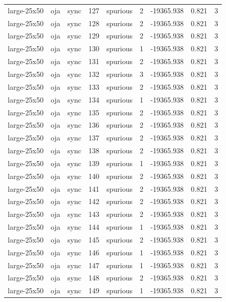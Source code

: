 \begin{tabular}{lllrlrrrr}
large-25x50 & oja & sync & 127 & spurious & 2 & -19365.938 & 0.821 & 3 \\
large-25x50 & oja & sync & 128 & spurious & 2 & -19365.938 & 0.821 & 3 \\
large-25x50 & oja & sync & 129 & spurious & 2 & -19365.938 & 0.821 & 3 \\
large-25x50 & oja & sync & 130 & spurious & 1 & -19365.938 & 0.821 & 3 \\
large-25x50 & oja & sync & 131 & spurious & 2 & -19365.938 & 0.821 & 3 \\
large-25x50 & oja & sync & 132 & spurious & 3 & -19365.938 & 0.821 & 3 \\
large-25x50 & oja & sync & 133 & spurious & 2 & -19365.938 & 0.821 & 3 \\
large-25x50 & oja & sync & 134 & spurious & 1 & -19365.938 & 0.821 & 3 \\
large-25x50 & oja & sync & 135 & spurious & 2 & -19365.938 & 0.821 & 3 \\
large-25x50 & oja & sync & 136 & spurious & 2 & -19365.938 & 0.821 & 3 \\
large-25x50 & oja & sync & 137 & spurious & 2 & -19365.938 & 0.821 & 3 \\
large-25x50 & oja & sync & 138 & spurious & 2 & -19365.938 & 0.821 & 3 \\
large-25x50 & oja & sync & 139 & spurious & 1 & -19365.938 & 0.821 & 3 \\
large-25x50 & oja & sync & 140 & spurious & 2 & -19365.938 & 0.821 & 3 \\
large-25x50 & oja & sync & 141 & spurious & 2 & -19365.938 & 0.821 & 3 \\
large-25x50 & oja & sync & 142 & spurious & 2 & -19365.938 & 0.821 & 3 \\
large-25x50 & oja & sync & 143 & spurious & 2 & -19365.938 & 0.821 & 3 \\
large-25x50 & oja & sync & 144 & spurious & 1 & -19365.938 & 0.821 & 3 \\
large-25x50 & oja & sync & 145 & spurious & 2 & -19365.938 & 0.821 & 3 \\
large-25x50 & oja & sync & 146 & spurious & 1 & -19365.938 & 0.821 & 3 \\
large-25x50 & oja & sync & 147 & spurious & 1 & -19365.938 & 0.821 & 3 \\
large-25x50 & oja & sync & 148 & spurious & 2 & -19365.938 & 0.821 & 3 \\
large-25x50 & oja & sync & 149 & spurious & 1 & -19365.938 & 0.821 & 3 \\

\end{tabular}
